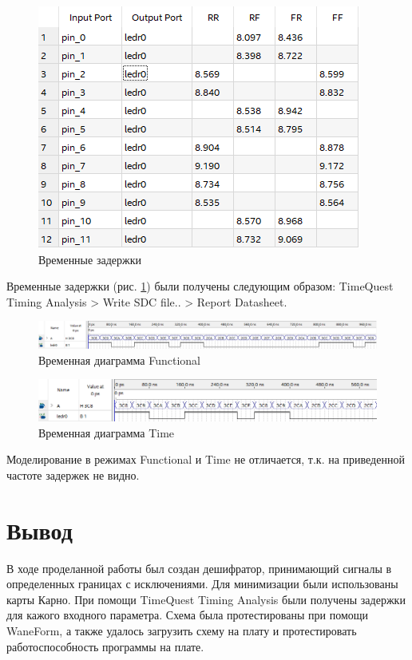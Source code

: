 \documentclass[a4paper,14pt]{article}
\begin{document}
	\begin{figure}[H]
		\centering
		\includegraphics[width=0.7\linewidth]{image/03_times}
		\caption{Временные задержки}
		\label{fig:03times}
	\end{figure}

	Временные задержки (рис. \ref{fig:03times}) были получены следующим образом:
	TimeQuest Timing Analysis > Write SDC file.. > Report Datasheet.

	\begin{figure}[H]
		\centering
		\includegraphics[width=1\linewidth]{image/03_wvf}
		\caption{Временная диаграмма Functional}
		\label{fig:03wvf}
	\end{figure}

	\begin{figure}[H]
		\centering
		\includegraphics[width=1\linewidth]{image/03_wvf1}
		\caption{Временная диаграмма Time}
		\label{fig:03wvf1}
	\end{figure}


 Моделирование в режимах Functional и Time не отличается, т.к. на приведенной частоте задержек не видно.

\section{Вывод}
В ходе проделанной работы был создан дешифратор, принимающий сигналы в определенных границах с исключениями.
Для минимизации были использованы карты Карно.
При помощи TimeQuest Timing Analysis были получены задержки для кажого входного параметра.
Схема была протестированы при помощи WaneForm, а также удалось загрузить схему на плату и протестировать работоспособность программы на плате.
\end{document}
